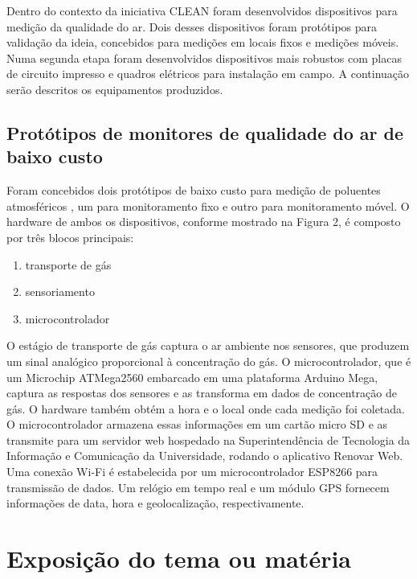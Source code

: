 Dentro do contexto da iniciativa CLEAN foram desenvolvidos dispositivos para medição da qualidade do ar. Dois desses dispositivos foram protótipos para validação da ideia, concebidos para medições em locais fixos e medições móveis. Numa segunda etapa foram desenvolvidos dispositivos mais robustos com placas de circuito impresso e quadros elétricos para instalação em campo. A continuação serão descritos os equipamentos produzidos.

\subsection{Protótipos de monitores de qualidade do ar de baixo custo}

Foram concebidos dois protótipos de baixo custo para medição de poluentes atmosféricos \cite*{Campo2020DEPLOYMENTRESULTS}, um para monitoramento fixo e outro para monitoramento móvel. O hardware de ambos os dispositivos, conforme mostrado na Figura 2, é composto por três blocos principais: 
\begin{enumerate}
	\item transporte de gás
	\item sensoriamento
	\item microcontrolador
\end{enumerate}

O estágio de transporte de gás captura o ar ambiente nos sensores, que produzem um sinal analógico proporcional à concentração do gás. O microcontrolador, que é um Microchip ATMega2560 embarcado em uma plataforma Arduino Mega, captura as respostas dos sensores e as transforma em dados de concentração de gás. O hardware também obtém a hora e o local onde cada medição foi coletada. O microcontrolador armazena essas informações em um cartão micro SD e as transmite para um servidor web hospedado na Superintendência de Tecnologia da Informação e Comunicação da Universidade, rodando o aplicativo Renovar Web. Uma conexão Wi-Fi é estabelecida por um microcontrolador ESP8266 para transmissão de dados. Um relógio em tempo real e um módulo GPS fornecem informações de data, hora e geolocalização, respectivamente.




\section{Exposição do tema ou matéria}


